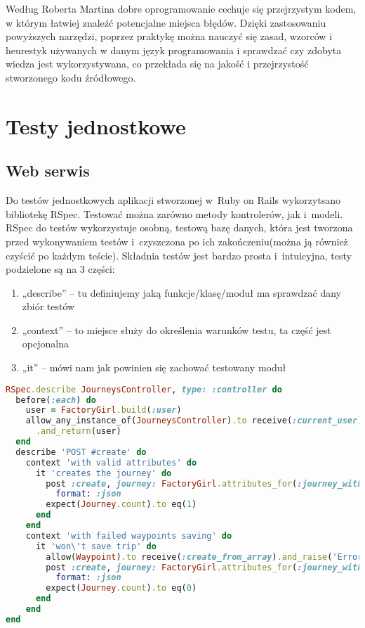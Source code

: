 \documentclass[eng,archivemode]{mgr}
\begin{document}
Według Roberta Martina\cite{clean code} dobre oprogramowanie cechuje się przejrzystym kodem, w którym łatwiej znaleźć potencjalne miejsca błędów. Dzięki zastosowaniu powyższych narzędzi, poprzez praktykę można nauczyć się zasad, wzorców i heurestyk używanych w danym język programowania i sprawdzać czy zdobyta wiedza jest wykorzystywana, co przekłada się na jakość i przejrzystość stworzonego kodu źródłowego.

\section{Testy jednostkowe}
\subsection{Web serwis}
Do testów jednostkowych aplikacji stworzonej w~Ruby on Rails wykorzytsano bibliotekę RSpec. Testować można zarówno metody kontrolerów, jak i~modeli. RSpec do testów wykorzystuje osobną, testową bazę danych, która jest tworzona przed wykonywaniem testów i~czyszczona po ich zakończeniu(można ją również czyścić po każdym teście). Składnia testów jest bardzo prosta i~intuicyjna, testy podzielone są na 3 części:
\begin{enumerate}
	\item „describe” – tu definiujemy jaką funkcje/klasę/moduł ma sprawdzać dany zbiór testów
	\item „context” – to miejsce służy do określenia warunków testu, ta część jest opcjonalna
	\item „it” – mówi nam jak powinien się zachować testowany moduł
\end{enumerate}

\begin{lstlisting}[language=ruby, caption={Przykład testów dla metody kontrolera}, label=lst:contoller_test]
RSpec.describe JourneysController, type: :controller do
  before(:each) do
    user = FactoryGirl.build(:user)
    allow_any_instance_of(JourneysController).to receive(:current_user)
      .and_return(user)
  end
  describe 'POST #create' do
    context 'with valid attributes' do
      it 'creates the journey' do
        post :create, journey: FactoryGirl.attributes_for(:journey_with_path),
          format: :json
        expect(Journey.count).to eq(1)
      end
    end
    context 'with failed waypoints saving' do
      it 'won\'t save trip' do
        allow(Waypoint).to receive(:create_from_array).and_raise('Error')
        post :create, journey: FactoryGirl.attributes_for(:journey_with_path),
          format: :json
        expect(Journey.count).to eq(0)
      end
    end
end
\end{lstlisting}
\end{document}
